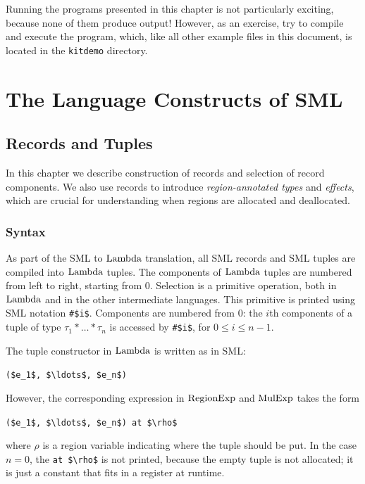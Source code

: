 \documentclass[12pt]{book}
\begin{document}
Running the programs presented in this chapter is not particularly exciting,
because none of them produce output! However, as an exercise, try to compile and
execute the
%
%
 program, which, like all other example files in this
document, is located in the
%
%
\lstinline{kitdemo} directory.


\part{The Language Constructs of SML}
\label{understanding.sec}

\chapter{Records and Tuples}
\label{records.sec}
In this chapter we describe construction of
%
%
records and selection of record components. We also use records to introduce
%
%
\emph{region-annotated types} and
%
%
\emph{effects}, which are crucial for understanding when regions are allocated
and deallocated.

\section{Syntax}

As part of the SML to
%
%
$\hbox{\rm Lambda}$ translation, all SML records and SML tuples are compiled into $\hbox{\rm Lambda}$
tuples. The components of $\hbox{\rm Lambda}$ tuples are numbered from left to right,
starting from 0.  Selection is a primitive operation, both in $\hbox{\rm Lambda}$ and in the
other intermediate languages. This primitive is printed using SML notation
\lstinline!#$i$!. Components are numbered from 0: the $i$th components of a tuple
of type $\tau_1\ast\ldots\ast\tau_n$ is accessed by \lstinline!#$i$!, for $0\leq
i\leq n-1$.

The tuple constructor in $\hbox{\rm Lambda}$ is written as in SML:
\begin{center}
  \lstinline!($e_1$, $\ldots$, $e_n$)!
\end{center}
However, the corresponding expression in $\hbox{\rm RegionExp}$ and $\hbox{\rm MulExp}$ takes the form
\begin{center}
  \lstinline!($e_1$, $\ldots$, $e_n$) at $\rho$!
\end{center}
%
%
%
where $\rho$ is a
%
%
region variable indicating where the tuple should be put.  In the case $n=0$,
the \lstinline!at $\rho$! is not printed, because the empty tuple is not
allocated; it is just a constant that fits in a
%
%
register at runtime.
\end{document}
